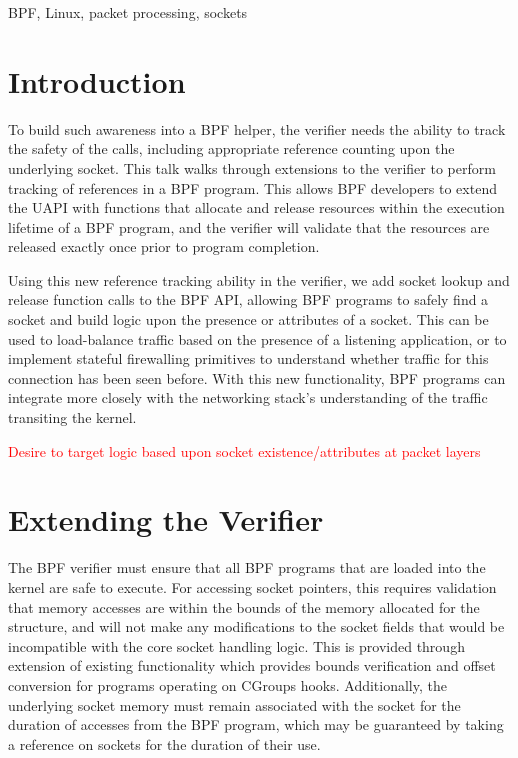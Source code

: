 \documentclass[10pt,sigconf,authorversion]{lpc}
\newcommand\todo[1]{\textcolor{red}{#1}}
\begin{document}
BPF, Linux, packet processing, sockets

\section{Introduction}


To build such awareness into a BPF helper, the verifier needs the ability to
track the safety of the calls, including appropriate reference counting upon
the underlying socket. This talk walks through extensions to the verifier to
perform tracking of references in a BPF program. This allows BPF developers to
extend the UAPI with functions that allocate and release resources within the
execution lifetime of a BPF program, and the verifier will validate that the
resources are released exactly once prior to program completion.

Using this new reference tracking ability in the verifier, we add socket lookup
and release function calls to the BPF API, allowing BPF programs to safely find
a socket and build logic upon the presence or attributes of a socket. This can
be used to load-balance traffic based on the presence of a listening
application, or to implement stateful firewalling primitives to understand
whether traffic for this connection has been seen before. With this new
functionality, BPF programs can integrate more closely with the networking
stack's understanding of the traffic transiting the kernel.

\todo{Desire to target logic based upon socket existence/attributes at packet
layers}

\section{Extending the Verifier}


The BPF verifier must ensure that all BPF programs that are loaded into the
kernel are safe to execute. For accessing socket pointers, this requires
validation that memory accesses are within the bounds of the memory allocated
for the structure, and will not make any modifications to the socket fields
that would be incompatible with the core socket handling logic. This is
provided through extension of existing functionality which provides bounds
verification and offset conversion for programs operating on CGroups hooks.
Additionally, the underlying socket memory must remain associated with the
socket for the duration of accesses from the BPF program, which may be
guaranteed by taking a reference on sockets for the duration of their use.
\end{document}
